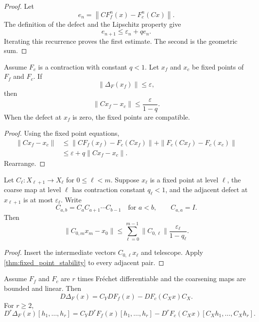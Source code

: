 \begin{proof}
Let
\[
e_n=\left\|CF_f^n(x)-F_c^n(Cx)\right\|.
\]
The definition of the defect and the Lipschitz property give
\[
e_{n+1}\le\varepsilon_n+qe_n.
\]
Iterating this recurrence proves the first estimate.  The second is the geometric sum.
\end{proof}

\begin{theorem}\label{thm:fixed_point_stability}
Assume $F_c$ is a contraction with constant $q<1$.  Let $x_f$ and $x_c$ be fixed points of $F_f$ and $F_c$.  If
\[
\|\Delta_F(x_f)\|\le\varepsilon,
\]
then
\[
\|Cx_f-x_c\|
\le
\frac{\varepsilon}{1-q}.
\]
When the defect at $x_f$ is zero, the fixed points are compatible.
\end{theorem}

\begin{proof}
Using the fixed point equations,
\[
\begin{aligned}
\|Cx_f-x_c\|
&\le
\|CF_f(x_f)-F_c(Cx_f)\|
+
\|F_c(Cx_f)-F_c(x_c)\|\\
&\le
\varepsilon+q\|Cx_f-x_c\|.
\end{aligned}
\]
Rearrange.
\end{proof}

\begin{corollary}\label{cor:multilevel_fixed_points}
Let $C_\ell:X_{\ell+1}\to X_\ell$ for $0\le\ell<m$.  Suppose $x_\ell$ is a fixed point at level $\ell$, the coarse map at level $\ell$ has contraction constant $q_\ell<1$, and the adjacent defect at $x_{\ell+1}$ is at most $\varepsilon_\ell$.  Write
\[
C_{a,b}=C_aC_{a+1}\cdots C_{b-1}
\quad\text{for }a<b,
\qquad
C_{a,a}=I.
\]
Then
\[
\|C_{0,m}x_m-x_0\|
\le
\sum_{\ell=0}^{m-1}
\|C_{0,\ell}\|
\frac{\varepsilon_\ell}{1-q_\ell}.
\]
\end{corollary}

\begin{proof}
Insert the intermediate vectors $C_{0,\ell}x_\ell$ and telescope.  Apply \cref{thm:fixed_point_stability} to every adjacent pair.
\end{proof}

\begin{proposition}\label{prop:derivative_defects}
Assume $F_f$ and $F_c$ are $r$ times Fr\'echet differentiable and the coarsening maps are bounded and linear.  Then
\[
D\Delta_F(x)
=
C_YDF_f(x)-DF_c(C_Xx)C_X.
\]
For $r\ge2$,
\[
D^r\Delta_F(x)[h_1,\ldots,h_r]
=
C_YD^rF_f(x)[h_1,\ldots,h_r]
-
D^rF_c(C_Xx)[C_Xh_1,\ldots,C_Xh_r].
\]
\end{proposition}

